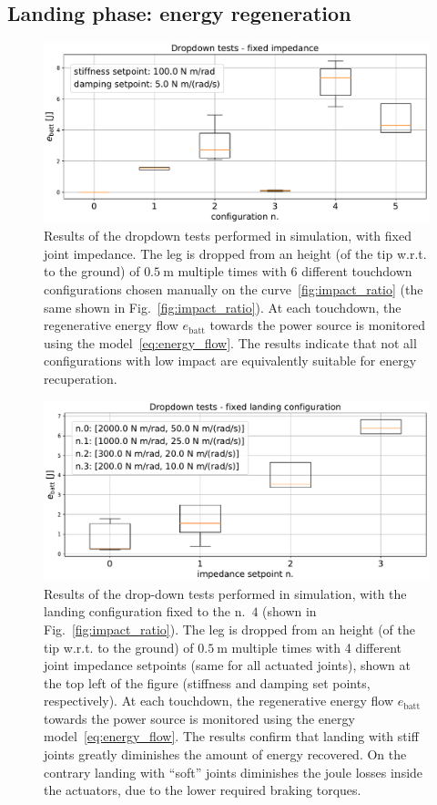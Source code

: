\subsection{Landing phase: energy regeneration}\label{subsec:energy_reg}
\begin{figure}[t]
    \centering
    \includegraphics[width=1\columnwidth]{images/dropdown_const_imp.pdf}
    \caption{Results of the dropdown tests performed in simulation, with fixed joint impedance. The leg is dropped from an height (of the tip w.r.t. to the ground) of $0.5~\mathrm{m}$ multiple times with 6 different touchdown configurations chosen manually on the curve~\ref{fig:impact_ratio} (the same shown in Fig.~\ref{fig:impact_ratio}). At each touchdown, the regenerative energy flow $e_{\mathrm{batt}}$ towards the power source is monitored using the model~\eqref{eq:energy_flow}. The results indicate that not all configurations with low impact are equivalently suitable for energy recuperation.}
    \label{fig:fixed_imp_reg_energy}
\end{figure}
\begin{figure}[t]
    \centering
    \includegraphics[width=1\columnwidth]{images/dropdown_const_landing.pdf}
    \caption{Results of the drop-down tests performed in simulation, with the landing configuration fixed to the n.~$4$ (shown in Fig.~\ref{fig:impact_ratio}). The leg is dropped from an height (of the tip w.r.t. to the ground) of $0.5~\mathrm{m}$ multiple times with 4 different joint impedance setpoints (same for all actuated joints), shown at the top left of the figure (stiffness and damping set points, respectively). At each touchdown, the regenerative energy flow $e_{\mathrm{batt}}$ towards the power source is monitored using the energy model~\eqref{eq:energy_flow}. The results confirm that landing with stiff joints greatly diminishes the amount of energy recovered. On the contrary landing with \enquote{soft} joints diminishes the joule losses inside the actuators, due to the lower required braking torques.}
    \label{fig:fixed_conf_reg_energy}
\end{figure}

